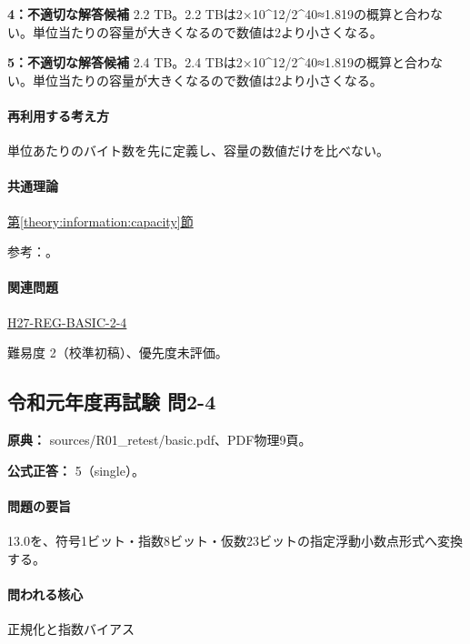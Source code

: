 \noindent\textbf{4：不適切な解答候補} 2.2 TB。2.2 TBは2×10\textasciicircum{}12/2\textasciicircum{}40≈1.819の概算と合わない。単位当たりの容量が大きくなるので数値は2より小さくなる。\par

\noindent\textbf{5：不適切な解答候補} 2.4 TB。2.4 TBは2×10\textasciicircum{}12/2\textasciicircum{}40≈1.819の概算と合わない。単位当たりの容量が大きくなるので数値は2より小さくなる。\par

\paragraph{再利用する考え方} 単位あたりのバイト数を先に定義し、容量の数値だけを比べない。

\paragraph{共通理論} \hyperref[theory:information:capacity]{第\ref*{theory:information:capacity}節}

\par 参考：\cite{nist_binary_prefix}。

\paragraph{関連問題} \hyperref[q:h27-reg-basic-2-4]{H27-REG-BASIC-2-4}

\par 難易度 2（校準初稿）、優先度未評価。

\subsection{令和元年度再試験 問2-4}
\label{q:r01-ret-basic-2-4}

\noindent\textbf{原典：} sources/R01\_retest/basic.pdf、PDF物理9頁。

\textbf{公式正答：} 5（single）。

\paragraph{問題の要旨} 13.0を、符号1ビット・指数8ビット・仮数23ビットの指定浮動小数点形式へ変換する。

\paragraph{問われる核心} 正規化と指数バイアス

